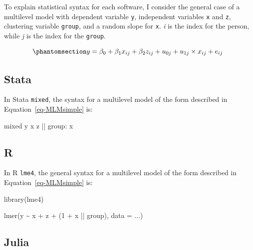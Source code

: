 \documentclass[
  letterpaper,
  DIV=11,
  numbers=noendperiod]{scrreprt}
\newenvironment{Shaded}{\begin{snugshade}}{\end{snugshade}}
\newcommand{\AttributeTok}[1]{\textcolor[rgb]{0.40,0.45,0.13}{#1}}
\newcommand{\DecValTok}[1]{\textcolor[rgb]{0.68,0.00,0.00}{#1}}
\newcommand{\FunctionTok}[1]{\textcolor[rgb]{0.28,0.35,0.67}{#1}}
\newcommand{\NormalTok}[1]{\textcolor[rgb]{0.00,0.23,0.31}{#1}}
\newcommand{\SpecialCharTok}[1]{\textcolor[rgb]{0.37,0.37,0.37}{#1}}
\begin{document}
To explain statistical syntax for each software, I consider the general
case of a multilevel model with dependent variable \texttt{y},
independent variables \texttt{x} and \texttt{z}, clustering variable
\texttt{group}, and a random slope for \texttt{x}. \emph{i} is the index
for the person, while \emph{j} is the index for the \texttt{group}.

\begin{equation}\phantomsection\label{eq-MLMsimple}{y = \beta_0 + \beta_1 x_{ij} + \beta_2 z_{ij} + u_{0j} + u_{1j} \times x_{ij} + e_{ij}}\end{equation}

\subsection{Stata}

In Stata \texttt{mixed}, the syntax for a multilevel model of the form
described in Equation~\ref{eq-MLMsimple} is:

\begin{Shaded}
\begin{Highlighting}[]
\NormalTok{mixed }\FunctionTok{y}\NormalTok{ x z || }\FunctionTok{group}\NormalTok{: x}
\end{Highlighting}
\end{Shaded}

\subsection{R}

In R \texttt{lme4}, the general syntax for a multilevel model of the
form described in Equation~\ref{eq-MLMsimple} is:

\begin{Shaded}
\begin{Highlighting}[]
\FunctionTok{library}\NormalTok{(lme4)}

\FunctionTok{lmer}\NormalTok{(y }\SpecialCharTok{\textasciitilde{}}\NormalTok{ x }\SpecialCharTok{+}\NormalTok{ z }\SpecialCharTok{+}\NormalTok{ (}\DecValTok{1} \SpecialCharTok{+}\NormalTok{ x }\SpecialCharTok{||}\NormalTok{ group), }\AttributeTok{data =}\NormalTok{ ...)}
\end{Highlighting}
\end{Shaded}

\subsection{Julia}
\end{document}
